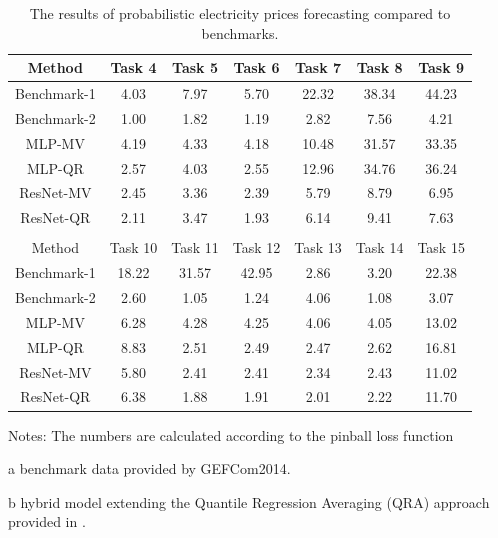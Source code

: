 \documentclass[review]{elsarticle}
\begin{document}
    \begin{table}[H]
      \caption{The results of probabilistic electricity prices forecasting compared to benchmarks.}
      \begin{adjustbox}{width=\textwidth}
      \begin{threeparttable}
        \begin{center}
          \begin{tabular}{ccccccc}
            \hline
            Method & Task 4 & Task 5& Task 6 & Task 7& Task 8 & Task 9\\
            \hline
            Benchmark-1 \tnote{a} & 4.03 & 7.97 & 5.70 & 22.32 & 38.34 & 44.23 \\
            Benchmark-2 \tnote{b} & 1.00 & 1.82 & 1.19 & 2.82 & 7.56 & 4.21 \\
            \hline
            MLP-MV & 4.19 & 4.33 & 4.18 & 10.48 & 31.57 & 33.35 \\
            MLP-QR & 2.57 & 4.03 & 2.55 & 12.96 & 34.76 & 36.24 \\
            ResNet-MV& 2.45 & 3.36 & 2.39 & 5.79 & 8.79 & 6.95 \\
            ResNet-QR& 2.11& 3.47& 1.93 & 6.14 & 9.41 & 7.63 \\
            \hline
            \\
            \hline
            Method & Task 10 & Task 11& Task 12 & Task 13 & Task 14 & Task 15\\
            \hline
            Benchmark-1 \tnote{a} &  18.22 & 31.57 & 42.95 & 2.86 & 3.20 & 22.38\\
            Benchmark-2 \tnote{b} &  2.60 & 1.05 & 1.24 & 4.06 & 1.08 & 3.07 \\
            \hline
            MLP-MV &  6.28 & 4.28 & 4.25 & 4.06 & 4.05 & 13.02\\
            MLP-QR &  8.83 & 2.51 & 2.49 & 2.47 & 2.62 & 16.81\\
            ResNet-MV & 5.80 & 2.41 & 2.41 & 2.34 & 2.43 & 11.02 \\
            ResNet-QR & 6.38 & 1.88 & 1.91 & 2.01 & 2.22 &11.70 \\
            \hline
          \end{tabular}
            \begin{tablenotes}
              Notes: The numbers are calculated according to the pinball loss function
              \item[a] benchmark data provided by GEFCom2014.
              \item[b] hybrid model extending the Quantile Regression Averaging (QRA) approach provided in \cite{Maciejowska2016}.
            \end{tablenotes}
        \end{center}
      \end{threeparttable}
      \end{adjustbox}
      \label{table:result_pinball}
    \end{table}
\end{document}
